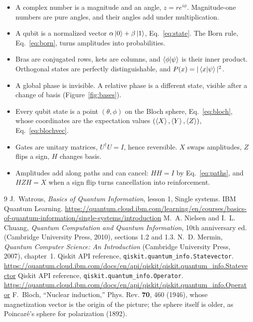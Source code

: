 \documentclass[11pt]{article}
\newcommand{\code}[1]{\texttt{#1}}
\begin{document}
\begin{itemize}
\item A complex number is a magnitude and an angle, $z = re^{i\phi}$. Magnitude-one numbers are pure angles, and their angles add under multiplication.
\item A qubit is a normalized vector $\alpha\ket0 + \beta\ket1$, Eq.~\eqref{eq:state}. The Born rule, Eq.~\eqref{eq:born}, turns amplitudes into probabilities.
\item Bras are conjugated rows, kets are columns, and $\braket{\phi|\psi}$ is their inner product. Orthogonal states are perfectly distinguishable, and $P(x) = |\braket{x|\psi}|^2$.
\item A global phase is invisible. A relative phase is a different state, visible after a change of basis (Figure~\ref{fig:bases}).
\item Every qubit state is a point $(\theta, \phi)$ on the Bloch sphere, Eq.~\eqref{eq:bloch}, whose coordinates are the expectation values $(\braket X, \braket Y, \braket Z)$, Eq.~\eqref{eq:blochvec}.
\item Gates are unitary matrices, $U^\dagger U = I$, hence reversible. $X$ swaps amplitudes, $Z$ flips a sign, $H$ changes basis.
\item Amplitudes add along paths and can cancel: $HH = I$ by Eq.~\eqref{eq:paths}, and $HZH = X$ when a sign flip turns cancellation into reinforcement.
\end{itemize}

\begin{thebibliography}{9}
 J.~Watrous, \emph{Basics of Quantum Information}, lesson 1, Single systems. IBM Quantum Learning. \url{https://quantum.cloud.ibm.com/learning/en/courses/basics-of-quantum-information/single-systems/introduction}
 M.~A. Nielsen and I.~L. Chuang, \emph{Quantum Computation and Quantum Information}, 10th anniversary ed. (Cambridge University Press, 2010), sections 1.2 and 1.3.
 N.~D. Mermin, \emph{Quantum Computer Science: An Introduction} (Cambridge University Press, 2007), chapter~1.
 Qiskit API reference, \code{qiskit.quantum\_info.Statevector}. \url{https://quantum.cloud.ibm.com/docs/en/api/qiskit/qiskit.quantum_info.Statevector}
 Qiskit API reference, \code{qiskit.quantum\_info.Operator}. \url{https://quantum.cloud.ibm.com/docs/en/api/qiskit/qiskit.quantum_info.Operator}
 F.~Bloch, ``Nuclear induction,'' Phys. Rev. \textbf{70}, 460 (1946), whose magnetization vector is the origin of the picture; the sphere itself is older, as Poincar\'e's sphere for polarization (1892).
\end{thebibliography}
\end{document}
